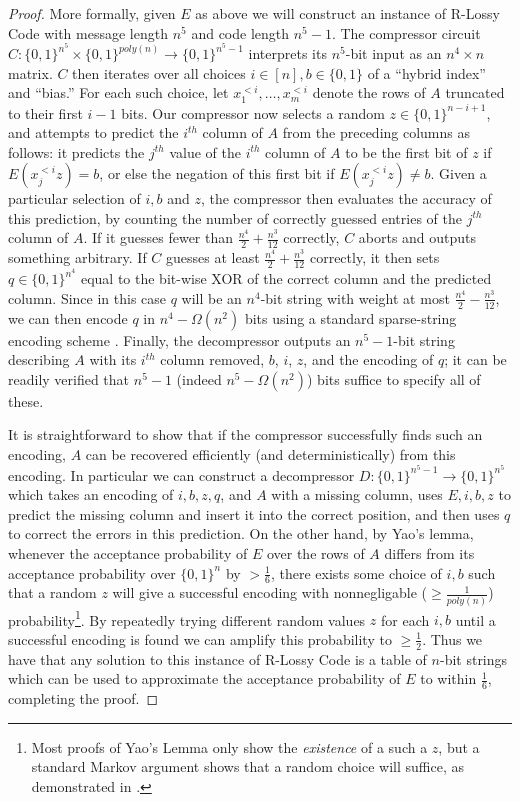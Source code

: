 \documentclass[11pt]{article}
\newcommand{\B}{\{0,1\}}
\begin{document}
\begin{proof}
More formally, given $E$ as above we will construct an instance of {\sc R-Lossy Code} with message length $n^5$ and code length $n^5-1$. The compressor circuit $C\colon \B^{n^5} \times \B^{poly(n)} \to \B^{n^5-1}$ interprets its $n^5$-bit input as an $n^4 \times n$ matrix. $C$ then iterates over all choices $i \in [n], b \in \B$ of a ``hybrid index'' and ``bias.'' For each such choice, let $x^{<i}_1,\ldots,x^{<i}_m$ denote the rows of $A$ truncated to their first $i-1$ bits. Our compressor now selects a random $z \in \B^{n - i + 1}$, and attempts to predict the $i^{th}$ column of $A$ from the preceding columns as follows: it predicts the $j^{th}$ value of the $i^{th}$ column of $A$ to be the first bit of $z$ if $E(x^{<i}_j z)= b$, or else the negation of this first bit if $E(x^{<i}_j z)\neq b$. Given a particular selection of $i,b$ and $z$, the compressor then evaluates the accuracy of this prediction, by counting the number of correctly guessed entries of the $j^{th}$ column of $A$. If it guesses fewer than $\frac{n^4}{2} + \frac{n^3}{12}$ correctly, $C$ aborts and outputs something arbitrary. If $C$ guesses at least $\frac{n^4}{2} + \frac{n^3}{12}$ correctly, it then sets $q \in \B^{n^4}$ equal to the bit-wise XOR of the correct column and the predicted column. Since in this case $q$ will be an $n^4$-bit string with weight at most $\frac{n^4}{2}-\frac{n^3}{12}$, we can then encode $q$ in $n^4-\Omega(n^2)$ bits using a standard sparse-string encoding scheme \cite{Korten}. Finally, the decompressor outputs an $n^5-1$-bit string describing $A$ with its $i^{th}$ column removed, $b$, $i$, $z$, and the encoding of $q$; it can be readily verified that $n^5-1$ (indeed $n^5 - \Omega(n^2)$) bits suffice to specify all of these.

It is straightforward to show that if the compressor successfully finds such an encoding, $A$ can be recovered efficiently (and deterministically) from this encoding. In particular we can construct a decompressor $D\colon \B^{n^5-1} \to \B^{n^5}$ which takes an encoding of $i,b,z,q$, and $A$ with a missing column, uses $E,i,b,z$ to predict the missing column and insert it into the correct position, and then uses $q$ to correct the errors in this prediction. On the other hand, by Yao's lemma, whenever the acceptance probability of $E$ over the rows of $A$ differs from its acceptance probability over $\B^n$ by $> \frac{1}{6}$, there exists some choice of $i,b$ such that a random $z$ will give a successful encoding with nonnegligable ($\geq \frac{1}{poly(n)}$) probability\footnote{Most proofs of Yao's Lemma only show the \emph{existence} of a such a $z$, but a standard Markov argument shows that a random choice will suffice, as demonstrated in \cite{Hirahara}.}. By repeatedly trying different random values $z$ for each $i,b$ until a successful encoding is found we can amplify this probability to $\geq \frac{1}{2}$. Thus we have that any solution to this instance of {\sc R-Lossy Code} is a table of $n$-bit strings which can be used to approximate the acceptance probability of $E$ to within $\frac{1}{6}$, completing the proof.
\end{proof}
\end{document}
